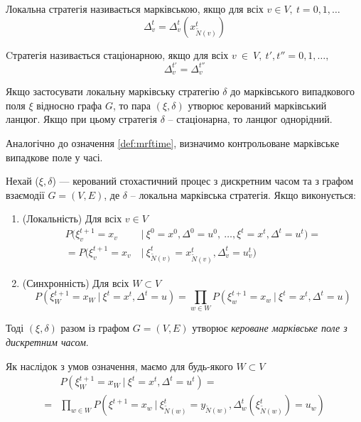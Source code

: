 \documentclass[oneside,14pt]{extarticle}
\begin{document}
\begin{definition}
Локальна стратегія називається марківською, якщо для всіх \(v \in V,\ t = 0, 1, \ldots\) 
\[\Delta_v^{t} = \Delta_v^{t}(x_{\tilde{N}(v)}^t)\]
\end{definition}

\begin{definition}
Cтратегія називається стаціонарною, якщо для всіх \(v~\in~V,\ t', t'' = 0, 1, \ldots,\)
\[\Delta_v^{t'} = \Delta_v^{t''}\]
\end{definition}

Якщо застосувати локальну марківську стратегію \(\delta\) до марківського випадкового поля \(\xi\) відносно графа \(G\), то пара \((\xi, \delta)\) утворює керований марківський ланцюг. Якщо при цьому стратегія \(\delta\) – стаціонарна, то ланцюг однорідний.

	Аналогічно до означення \ref{def:mrftime}, визначимо контрольоване марківське випадкове поле у часі.
	
\begin{definition}
\label{def:ctrlmrftime}
Нехай (\(\xi, \delta \)) — керований стохастичний процес з дискретним часом та з графом взаємодії \(G = (V, E)\), де \(\delta\) – локальна марківська стратегія. Якщо виконується:
\begin{enumerate}
    \item (Локальність) Для всіх \(v \in V\)
	\begin{align*}
    P(\xi_v^{t+1} = x_v\ &|\ \xi^0 = x^0, \Delta^0 = u^0,\ \ldots, \xi^t = x^t, \Delta^t = u^t) = \\
	= P(\xi_v^{t+1} = x_v\ &|\ \xi_{\tilde N(v)}^t = x_{\tilde N(v)}^t, \Delta_v^t = u_v^t)
	\end{align*}
	\item (Синхронність) Для всіх \(W \subset V\)
	\[P(\xi^{t+1}_W = x_W\ |\ \xi^t = x^t, \Delta^t = u) = \prod_{w \in W} P(\xi^{t+1}_w = x_w\ |\ \xi^t = x^t, \Delta^t = u) \]
\end{enumerate}
Тоді \((\xi, \delta)\) разом із графом \(G=(V,E)\) утворює \textit{кероване марківське поле з дискретним часом}.
\end{definition}

Як наслідок з умов означення, маємо для будь-якого \(W \subset V\)
\begin{align*}
&P(\xi_W^{t+1} = x_W\ |\ \xi^t = x^t, \Delta^t = u^t) = \\
= &\prod_{w \in W} P(\xi^{t+1} = x_w\ |\ \xi_{\tilde{N}(w)}^t = y_{\tilde{N}(w)}, \Delta_w^t(\xi_{\tilde{N}(w)}^t) = u_w)
\end{align*}
\end{document}
